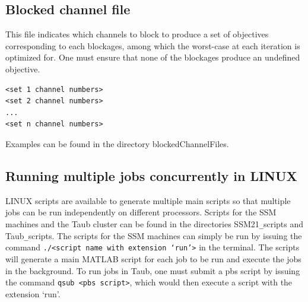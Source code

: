 \documentclass[11pt,letterpaper]{article}
\begin{document}
\subsection{Blocked channel file}
\label{subsec_blocked_channel_file}
This file indicates which channels to block to produce a set of objectives corresponding to each blockages, among which the worst-case at each iteration is optimized for. One must ensure that none of the blockages produce an undefined objective.  
\begin{verbatim}
<set 1 channel numbers>
<set 2 channel numbers>
...
<set n channel numbers>
\end{verbatim}
Examples can be found in the directory blockedChannelFiles. 

\subsection{Running multiple jobs concurrently in LINUX}
LINUX scripts are available to generate multiple main scripts so that multiple jobs can be run independently on different processors. Scripts for the SSM machines and the Taub cluster can be found in the directories SSM21\texttt{\_}scripts and  Taub\texttt{\_}scripts. The scripts for the SSM machines can simply be run by issuing the command \texttt{./<script name with extension `run'>} in the terminal. The scripts will generate a main MATLAB script for each job to be run and execute the jobs in the background. To run jobs in Taub, one must submit a pbs script by issuing the command \texttt{qsub  <pbs script>}, which would then execute a script with the extension `run'.

\FloatBarrier
\end{document}
